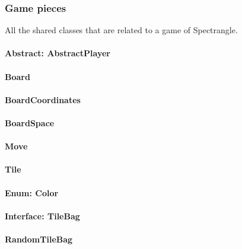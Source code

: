 \documentclass[12pt, letterpaper]{article}
\begin{document}


    \subsubsection{Game pieces}

    All the shared classes that are related to a game of Spectrangle.

    \paragraph{Abstract: AbstractPlayer}

    \paragraph{Board}

    \paragraph{BoardCoordinates}

    \paragraph{BoardSpace}

    \paragraph{Move}


    \paragraph{Tile}

    \paragraph{Enum: Color}

    \paragraph{Interface: TileBag}

    \paragraph{RandomTileBag}
\end{document}
